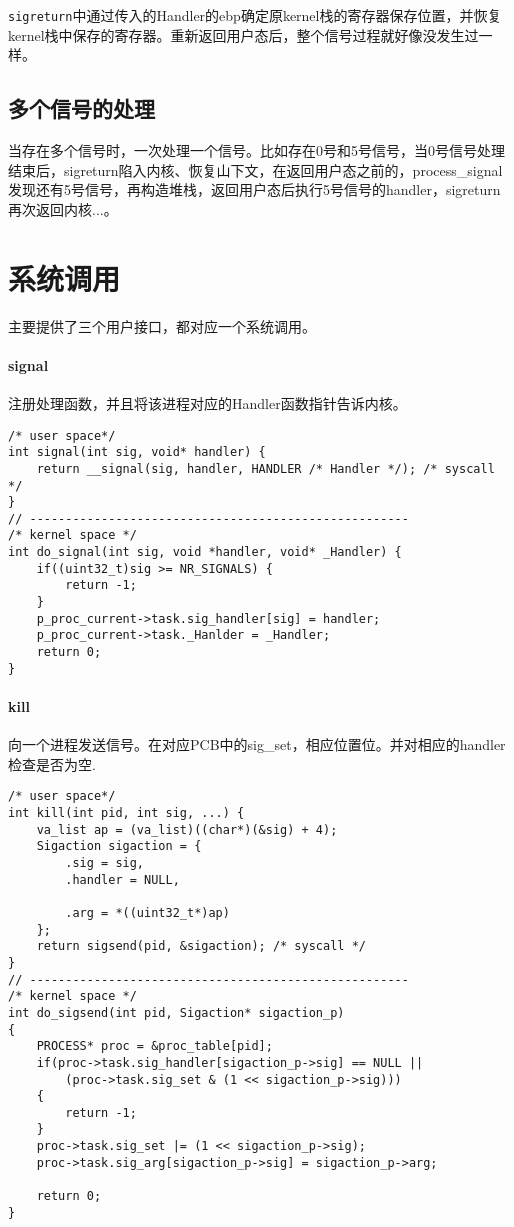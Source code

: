 \documentclass[UTF8]{ctexart}
\begin{document}
\texttt{sigreturn}中通过传入的Handler的ebp确定原kernel栈的寄存器保存位置，并恢复kernel栈中保存的寄存器。重新返回用户态后，整个信号过程就好像没发生过一样。

\subsection{多个信号的处理}

当存在多个信号时，一次处理一个信号。比如存在0号和5号信号，当0号信号处理结束后，sigreturn陷入内核、恢复山下文，在返回用户态之前的，process\_signal发现还有5号信号，再构造堆栈，返回用户态后执行5号信号的handler，sigreturn再次返回内核...。

\section{系统调用}

主要提供了三个用户接口，都对应一个系统调用。

\paragraph{signal} 注册处理函数，并且将该进程对应的Handler函数指针告诉内核。

\begin{verbatim}
/* user space*/
int signal(int sig, void* handler) {
    return __signal(sig, handler, HANDLER /* Handler */); /* syscall */
}
// -----------------------------------------------------
/* kernel space */
int do_signal(int sig, void *handler, void* _Handler) {
    if((uint32_t)sig >= NR_SIGNALS) {
        return -1;
    }
    p_proc_current->task.sig_handler[sig] = handler;
    p_proc_current->task._Hanlder = _Handler;
    return 0;
}
\end{verbatim}


\paragraph{kill} 向一个进程发送信号。在对应PCB中的sig\_set，相应位置位。并对相应的handler检查是否为空.

\begin{verbatim}
/* user space*/
int kill(int pid, int sig, ...) {
    va_list ap = (va_list)((char*)(&sig) + 4);
    Sigaction sigaction = {
        .sig = sig,
        .handler = NULL,
        
        .arg = *((uint32_t*)ap)
    };
    return sigsend(pid, &sigaction); /* syscall */
}
// -----------------------------------------------------
/* kernel space */
int do_sigsend(int pid, Sigaction* sigaction_p)
{
    PROCESS* proc = &proc_table[pid];
    if(proc->task.sig_handler[sigaction_p->sig] == NULL ||
        (proc->task.sig_set & (1 << sigaction_p->sig))) 
    {
        return -1;
    }
    proc->task.sig_set |= (1 << sigaction_p->sig);
    proc->task.sig_arg[sigaction_p->sig] = sigaction_p->arg;

    return 0;
}
\end{verbatim}
\end{document}
